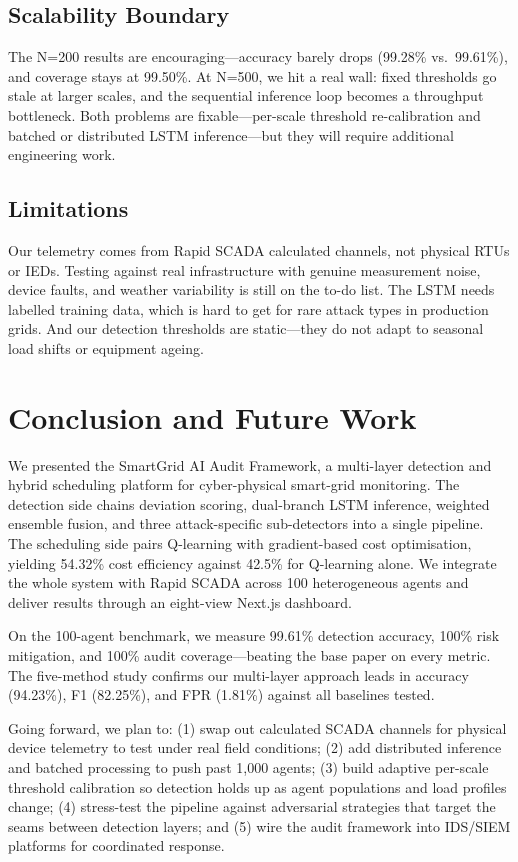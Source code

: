 \documentclass[conference]{IEEEtran}
\begin{document}
\subsection{Scalability Boundary}

The N=200 results are encouraging---accuracy barely drops (99.28\% vs.\ 99.61\%), and coverage stays at 99.50\%. At N=500, we hit a real wall: fixed thresholds go stale at larger scales, and the sequential inference loop becomes a throughput bottleneck. Both problems are fixable---per-scale threshold re-calibration and batched or distributed LSTM inference---but they will require additional engineering work.

\subsection{Limitations}

Our telemetry comes from Rapid SCADA calculated channels, not physical RTUs or IEDs. Testing against real infrastructure with genuine measurement noise, device faults, and weather variability is still on the to-do list. The LSTM needs labelled training data, which is hard to get for rare attack types in production grids. And our detection thresholds are static---they do not adapt to seasonal load shifts or equipment ageing.

\section{Conclusion and Future Work}

We presented the SmartGrid AI Audit Framework, a multi-layer detection and hybrid scheduling platform for cyber-physical smart-grid monitoring. The detection side chains deviation scoring, dual-branch LSTM inference, weighted ensemble fusion, and three attack-specific sub-detectors into a single pipeline. The scheduling side pairs Q-learning with gradient-based cost optimisation, yielding 54.32\% cost efficiency against 42.5\% for Q-learning alone. We integrate the whole system with Rapid SCADA across 100 heterogeneous agents and deliver results through an eight-view Next.js dashboard.

On the 100-agent benchmark, we measure 99.61\% detection accuracy, 100\% risk mitigation, and 100\% audit coverage---beating the base paper on every metric. The five-method study confirms our multi-layer approach leads in accuracy (94.23\%), F1 (82.25\%), and FPR (1.81\%) against all baselines tested.

Going forward, we plan to: (1) swap out calculated SCADA channels for physical device telemetry to test under real field conditions; (2) add distributed inference and batched processing to push past 1{,}000 agents; (3) build adaptive per-scale threshold calibration so detection holds up as agent populations and load profiles change; (4) stress-test the pipeline against adversarial strategies that target the seams between detection layers; and (5) wire the audit framework into IDS/SIEM platforms for coordinated response.
\end{document}
